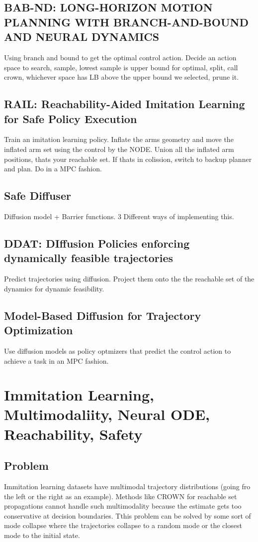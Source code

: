 \documentclass[12pt]{article}
\begin{document}
\subsection{BAB-ND: LONG-HORIZON MOTION PLANNING WITH BRANCH-AND-BOUND AND NEURAL DYNAMICS}
Using branch and bound to get the optimal control action. Decide an action space to search, sample, lowest sample is upper bound for optimal, split, call crown, whichever space has LB above the upper bound we selected, prune it.

\subsection{RAIL: Reachability-Aided Imitation Learning for Safe Policy Execution}
Train an imitation learning policy. Inflate the arms geometry and move the inflated arm set using the control by the NODE. Union all the inflated arm positions, thats your reachable set. If thats in colission, switch to backup planner and plan. Do in a MPC fashion.

\subsection{Safe Diffuser}
Diffusion model + Barrier functions. 3 Different ways of implementing this.

\subsection{DDAT: DIffusion Policies enforcing dynamically feasible trajectories}
Predict trajectories using diffusion. Project them onto the the reachable set of the dynamics for dynamic feasibility. 

\subsection{Model-Based Diffusion for Trajectory Optimization}
Use diffusion models as policy optmizers that predict the control action to achieve a task in an MPC fashion.

\section{Immitation Learning, Multimodaliity, Neural ODE, Reachability, Safety}
\subsection{Problem}
Immitation learning datasets have multimodal trajectory distributions (going fro the left or the right as an example). Methods like CROWN for reachable set propagations cannot handle such multimodality because the estimate gets too conservative at decision boundaries.
Tthis problem can be solved by some sort of mode collapse where the trajectories collapse to a random mode or the closest mode to the initial state.   
\end{document}
